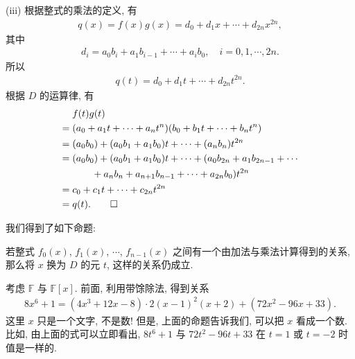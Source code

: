 \begin{pf}
    (iii) 根据整式的乘法的定义, 有
    \begin{align*}
        q(x) = f(x) g(x) = d_0 + d_1 x + \cdots + d_{2n} x^{2n},
    \end{align*}
    其中
    \begin{align*}
        d_i = a_0 b_i + a_1 b_{i-1} + \cdots + a_i b_0, \quad i = 0,1,\cdots,2n.
    \end{align*}
    所以
    \begin{align*}
        q(t) = d_0 + d_1 t + \cdots + d_{2n} t^{2n}.
    \end{align*}
    根据 $D$ 的运算律, 有
    \begin{align*}
             & f(t) g(t)                                                                        \\
        = {} & (a_0 + a_1 t + \cdots + a_n t^n) (b_0 + b_1 t + \cdots + b_n t^n)                \\
        = {} & (a_0 b_0) + (a_0 b_1 + a_1 b_0) t + \cdots + (a_n b_n) t^{2n}                    \\
        = {} & (a_0 b_0) + (a_0 b_1 + a_1 b_0) t + \cdots + (a_0 b_{2n} + a_1 b_{2n-1} + \cdots \\
             & \qquad + a_n b_n + a_{n+1} b_{n-1} + \cdots + a_{2n} b_0) t^{2n}                 \\
        = {} & c_0 + c_1 t + \cdots + c_{2n} t^{2n}                                             \\
        = {} & q(t). \qedhere
    \end{align*}
\end{pf}

我们得到了如下命题:
\begin{proposition}
    若整式 $f_0 (x)$, $f_1 (x)$, $\cdots$, $f_{n-1} (x)$ 之间有一个由加法与乘法计算得到的关系, 那么将 $x$ 换为 $D$ 的元 $t$, 这样的关系仍成立.
\end{proposition}

\begin{example}
    考虑 $\mathbb{F}$ 与 $\mathbb{F}[x]$. 前面, 利用带馀除法, 得到关系
    \begin{align*}
        8x^6 + 1 = (4x^3 + 12x - 8) \cdot 2(x-1)^2 (x+2) + (72x^2 - 96x + 33).
    \end{align*}
    这里 $x$ 只是一个文字, 不是数! 但是, 上面的命题告诉我们, 可以把 $x$ 看成一个数. 比如, 由上面的式可以立即看出, $8t^6 + 1$ 与 $72t^2 - 96t + 33$ 在 $t = 1$ 或 $t = -2$ 时值是一样的.
\end{example}

